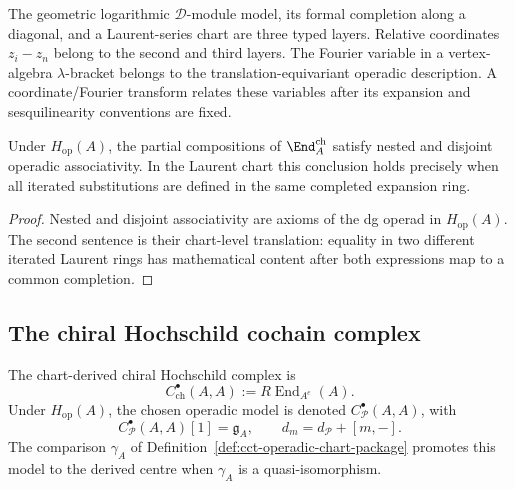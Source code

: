 \begin{remark}
\label{rem:endch-spectral-variable-layering}
The geometric logarithmic \(\mathcal D\)-module model, its formal
completion along a diagonal, and a Laurent-series chart are three
typed layers.  Relative coordinates \(z_i-z_n\) belong to the second
and third layers.  The Fourier variable in a vertex-algebra
\(\lambda\)-bracket belongs to the translation-equivariant operadic
description.  A coordinate/Fourier transform relates these variables
after its expansion and sesquilinearity conventions are fixed.
\end{remark}

\begin{lemma}
\label{lem:partial-comp-assoc}
Under \(H_{\mathrm{op}}(A)\), the partial compositions of
\(\End_A^{\mathrm{ch}}\) satisfy nested and disjoint operadic
associativity.  In the Laurent chart this conclusion holds precisely
when all iterated substitutions are defined in the same completed
expansion ring.
\end{lemma}

\begin{proof}
Nested and disjoint associativity are axioms of the dg operad in
\(H_{\mathrm{op}}(A)\).  The second sentence is their chart-level
translation: equality in two different iterated Laurent rings has
mathematical content after both expressions map to a common
completion.
\end{proof}

\subsection{The chiral Hochschild cochain complex}
\label{subsec:chiral-hoch-cochain}

\begin{definition}
\label{def:chiral-hochschild-cochain-brace}
The chart-derived chiral Hochschild complex is
\[
 C^\bullet_{\mathrm{ch}}(A,A)
 :=
 R\operatorname{End}_{A^e}(A).
\]
Under \(H_{\mathrm{op}}(A)\), the chosen operadic model is denoted
\(C^\bullet_{\mathcal P}(A,A)\), with
\[
 C^\bullet_{\mathcal P}(A,A)[1]=\mathfrak g_A,
 \qquad
 d_m=d_{\mathcal P}+[m,-].
\]
The comparison \(\gamma_A\) of
Definition~\ref{def:cct-operadic-chart-package} promotes this model to
the derived centre when \(\gamma_A\) is a quasi-isomorphism.
\end{definition}

